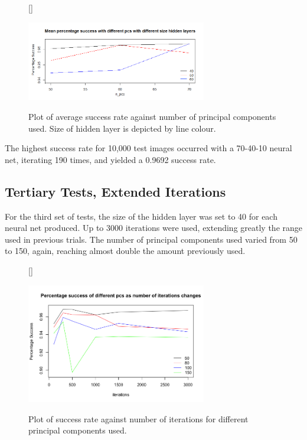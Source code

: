 \documentclass[11pt]{article} %
\begin{document}
\begin{figure}[htb!]
[\FBwidth]
{\caption{Plot of average success rate against number of principal components used. Size of hidden layer is depicted by line colour. }\label{fig:ext_mean_pc_nnet}}
{\includegraphics[width=0.7\textwidth]{nnet_mean_diff_pcs_extended_it2.png}}
\end{figure}

The highest success rate for 10,000 test images occurred with a 70-40-10 neural net, iterating 190 times, and yielded a 0.9692 success rate. 

\subsection{Tertiary Tests, Extended Iterations}

For the third set of tests, the size of the hidden layer was set to 40 for each neural net produced. Up to 3000 iterations were used, extending greatly the range used in previous trials. The number of principal components used varied from 50 to 150, again, reaching almost double the amount previously used.


\begin{figure}[htb!]
[\FBwidth]
{\caption{Plot of success rate against number of iterations for different principal components used. }\label{fig:superext_nnet}}
{\includegraphics[width=0.7\textwidth]{nn_superext.png}}
\end{figure}
\end{document}
